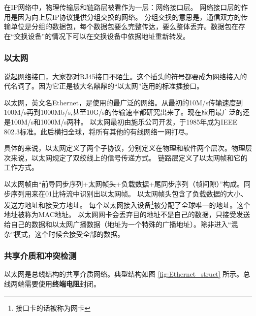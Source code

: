 在IP网络中，物理传输层和链路层被看作为一层：网络接口层。
网络接口层的作用是因为向上层IP协议提供分组交换的网络。
分组交换的意思是，通信双方的传输单位是分组的数据包，每个数据包要么完整传达，要么整体丢弃。数据包在存在“交换设备”的情况下可以在交换设备中依据地址重新转发。

\subsubsection{以太网}

说起网络接口，大家都对RJ45接口不陌生。这个插头的符号都要成为网络接入的代名词了。因为它正是被大名鼎鼎的“以太网”选用的标准插接口。



以太网，英文名Ethernet，是使用的最广泛的网络。从最初的10M/s传输速度到100M/s再到1000Mb/s,甚至10G/s的传输速率都研究出来了。现在应用最广泛的还是100M/s和1000M/s两种。
以太网最初由施乐公司开发，于1985年成为IEEE 802.3标准。此后横扫全球，将所有其他的有线网络一网打尽。

具体的来说，以太网定义了两个子协议，分别定义在物理和软件两个层次。物理层次来说，以太网规定了双绞线上的信号传递方式。%
链路层定义了以太网帧和它的工作方式。

以太网帧由“前导同步序列+太网帧头+负载数据+尾同步序列（帧间隙）”构成。同步序列用来在01比特流中识别出以太网帧。
以太网帧头包含了负载数据的大小、发送方地址和接受方地址。
每个以太网接入设备\footnote{接口卡的话被称为网卡}被分配了全球唯一的地址。这个地址被称为MAC地址。
以太网网卡会丢弃目的地址不是自己的数据，只接受发送给自己的数据和以太网广播数据（地址为一个特殊的广播地址）。除非进入“混杂”模式，这个时候会接受全部的数据。

\subsubsection*{共享介质和冲突检测}

以太网是总线结构的共享介质网络。典型结构如图 \ref{fig:Ethernet_struct} 所示。总线两端需要使用\textbf{终端电阻}封闭。


